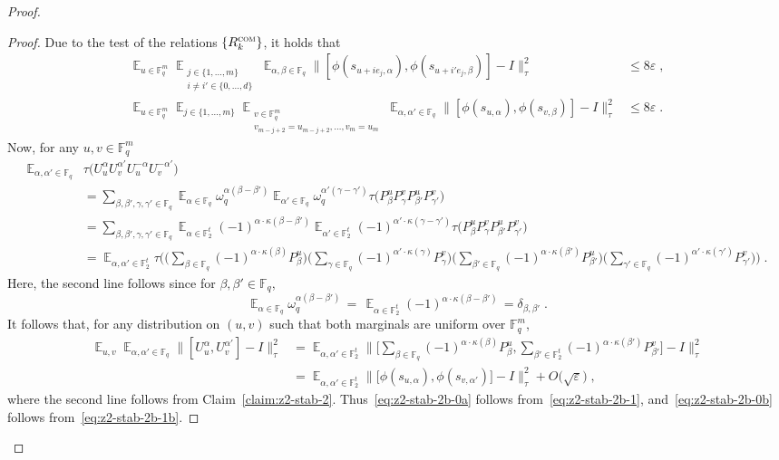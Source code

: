 \documentclass[11pt]{article}
\theoremstyle{definition}
\newcommand{\Id}{\ensuremath{I}}
\DeclareMathOperator*{\Expectation}{\mathbb{E}}
\newcommand{\Es}[1]{\Expectation_{#1}}
\newcommand{\F}{\ensuremath{\mathbb{F}}}
\newcommand{\com}{\textsc{com}}
\newcommand{\eps}{\varepsilon}
\begin{document}
\begin{proof}
\begin{proof}
Due to the test of the relations $\{R^\com_k\}$, it holds that 
\begin{align}
\Es{u\in \F_q^m} \Es{\substack{j\in\{1,\ldots,m\} \\ i\neq i' \in \{0,\ldots,d\}}} \Es{\alpha,\beta\in \F_q} \big\| [\phi(s_{u+i e_j,\alpha}),\phi(s_{u+i' e_j,\beta})] - \Id \big\|_\tau^2&\leq 8\eps\; ,\label{eq:z2-stab-2b-1}\\
\Es{u\in \F_q^m} \Es{j\in\{1,\ldots,m\}} \Es{\substack{v\in \F_q^m \\v_{m-j+2}=u_{m-j+2},\ldots,v_m=u_m}}\Es{\alpha,\alpha'\in \F_q} \big\| [\phi(s_{u,\alpha}),\phi(s_{v,\beta})]-\Id\big\|_\tau^2&\leq 8\eps\;.\label{eq:z2-stab-2b-1b}
\end{align}
Now, for any $u,v\in \F_q^m$
\begin{align*}
\Es{\alpha,\alpha'\in \F_q} &\tau\big( U_u^\alpha U_{v}^{\alpha'} U_u^{-\alpha} U_{v}^{-\alpha'} \big) \\
&= \sum_{\beta,\beta',\gamma,\gamma'\in \F_q}\Es{\alpha\in \F_q} \omega_q^{\alpha(\beta-\beta')} \Es{\alpha'\in \F_q} \omega_q^{\alpha'(\gamma-\gamma')}  \tau(P^{u}_\beta P^{v}_\gamma P^{u}_{\beta'} P^{v}_{\gamma'}\big)\\
&=\sum_{\beta,\beta',\gamma,\gamma'\in \F_q}\Es{\alpha\in\F_2^t} (-1)^{\alpha\cdot\kappa(\beta-\beta')} \Es{\alpha'\in\F_2^t} (-1)^{\alpha'\cdot\kappa(\gamma-\gamma')} \tau(P^{u}_\beta P^{v}_\gamma P^{u}_{\beta'} P^{v}_{\gamma'}\big)\\
&=\Es{\alpha,\alpha'\in\F_2^t}  \tau\Big( \Big(\sum_{\beta\in \F_q} (-1)^{\alpha\cdot \kappa(\beta)} P^{u}_\beta\Big) \Big(\sum_{\gamma\in \F_q} (-1)^{\alpha'\cdot \kappa(\gamma)} P^{v}_\gamma\Big)\Big(\sum_{\beta'\in \F_q} (-1)^{\alpha\cdot \kappa(\beta')} P^{u}_{\beta'}\Big)\Big(\sum_{\gamma'\in \F_q} (-1)^{\alpha'\cdot \kappa(\gamma')} P^{v}_{\gamma'}\Big)\Big)\;.
\end{align*}
Here, the second line follows since for $\beta,\beta'\in \F_q$,
\[ \Es{\alpha\in \F_q} \omega_q^{\alpha(\beta-\beta')}\,=\,\Es{\alpha\in\F_2^t} (-1)^{\alpha\cdot \kappa(\beta-\beta')}\,=\delta_{\beta,\beta'}\;.\]
It follows that, for any distribution on $(u,v)$ such that both marginals are uniform over $\F_q^m$,
\begin{align*}
\Es{u,v} \Es{\alpha,\alpha'\in \F_q} \big\| [U_u^\alpha ,U_{v}^{\alpha'} ]-\Id\big\|_\tau^2
&= \Es{\alpha,\alpha'\in \F_2^t} \Big\| \Big[\sum_{\beta\in \F_q} (-1)^{\alpha\cdot \kappa(\beta)} P^{u}_\beta ,\sum_{\beta'\in \F_2^t} (-1)^{\alpha\cdot \kappa(\beta')} P^{v}_{\beta'} \Big]-\Id\Big\|_\tau^2\\
&= \Es{\alpha,\alpha'\in \F_2^t} \big\| \big[ \phi(s_{u,\alpha}),\phi(s_{v,\alpha'})\big]-\Id\big\|_\tau^2+O\big(\sqrt{\eps}\big)\;,
\end{align*}
where the second line follows from Claim~\ref{claim:z2-stab-2}. Thus~\eqref{eq:z2-stab-2b-0a} follows from~\eqref{eq:z2-stab-2b-1}, and~\eqref{eq:z2-stab-2b-0b} follows from~\eqref{eq:z2-stab-2b-1b}.
\end{proof}


\end{proof}
\end{document}
